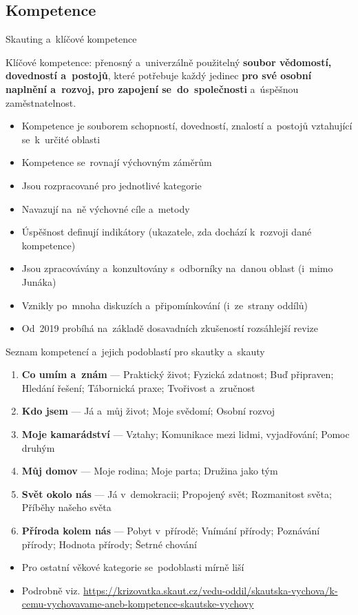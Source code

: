 \documentclass[compress, ucs, xelatex, 11pt, xcolor=dvipsnames, print, aspectratio=169,
	hyperref={
		bookmarks=true,
		unicode=true,
		colorlinks=true,
		pdftitle={Skautska vychovna metoda},
		plainpages=false,
		pdfauthor={Vojtech Zeisek},
		pdfsubject={Skautska vychovna metoda a jeji vyvoj za posledni stoleti a desetileti},
		pdfcreator={XeLaTeX},
		pdfkeywords={Junak, Pedagogika, Skaut, Skauting, Vychovna metoda},
		linkcolor=Red, %
		anchorcolor=ForestGreen, %
		citecolor=ForestGreen, %
		filecolor=ForestGreen, %
		menucolor=ForestGreen, %
		urlcolor=Sepia, %
		pdftex},
	url={hyphens, lowtilde} %
	]{beamer}
\begin{document}
\subsection{Kompetence}

\begin{frame}{Skauting a~klíčové kompetence}
	\begin{center}
		Klíčové kompetence: přenosný a~univerzálně použitelný \textbf{soubor vědomostí, dovedností a~postojů}, které potřebuje každý jedinec \textbf{pro své osobní naplnění a~rozvoj, pro zapojení se~do~společnosti} a~úspěšnou zaměstnatelnost.
	\end{center}
	\begin{itemize}
		\item Kompetence je souborem schopností, dovedností, znalostí a~postojů vztahující se~k~určité oblasti
		\item Kompetence se~rovnají výchovným záměrům
		\item Jsou rozpracované pro jednotlivé kategorie
		\item Navazují na~ně výchovné cíle a~metody
		\item Úspěšnost definují indikátory (ukazatele, zda dochází k~rozvoji dané kompetence)
		\item Jsou zpracovávány a~konzultovány s~odborníky na~danou oblast (i~mimo Junáka)
		\item Vznikly po~mnoha diskuzích a~připomínkování (i~ze~strany oddílů)
		\item Od~2019 probíhá na~základě dosavadních zkušeností rozsáhlejší revize
	\end{itemize}
\end{frame}

\begin{frame}{Seznam kompetencí a~jejich podoblastí pro skautky a~skauty}
	\begin{enumerate}
		\item \textbf{Co umím a~znám} --- Praktický život; Fyzická zdatnost; Buď připraven; Hledání řešení; Tábornická praxe; Tvořivost a~zručnost
		\item \textbf{Kdo jsem} --- Já a~můj život; Moje svědomí; Osobní rozvoj
		\item \textbf{Moje kamarádství} --- Vztahy; Komunikace mezi lidmi, vyjadřování; Pomoc druhým
		\item \textbf{Můj domov} --- Moje rodina; Moje parta; Družina jako tým
		\item \textbf{Svět okolo nás} --- Já v~demokracii; Propojený svět; Rozmanitost světa; Příběhy našeho světa
		\item \textbf{Příroda kolem nás} --- Pobyt v~přírodě; Vnímání přírody; Poznávání přírody; Hodnota přírody; Šetrné chování
	\end{enumerate}
	\begin{itemize}
		\item Pro ostatní věkové kategorie se~podoblasti mírně liší
		\item Podrobně viz. \url{https://krizovatka.skaut.cz/vedu-oddil/skautska-vychova/k-cemu-vychovavame-aneb-kompetence-skautske-vychovy}
	\end{itemize}
\end{frame}
\end{document}
